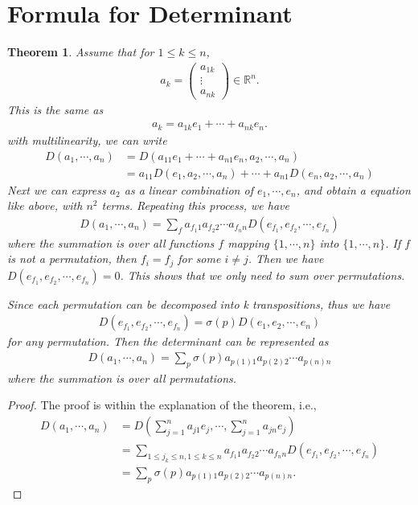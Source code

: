 \documentclass[11pt]{book}
\newtheorem{theorem}{Theorem}[section]
\theoremstyle{definition}
\numberwithin{equation}{chapter}
\begin{document}
\medskip

\section{Formula for Determinant}
\begin{theorem}
Assume that for $1\leq k \leq n$, 
\begin{align*}
    a_k = \left(
    \begin{matrix}
        a_{1k} \\
        \vdots \\
        a_{n k}
    \end{matrix}
    \right)\in\mathbb{R}^n.
\end{align*}
This is the same as 
\begin{align*}
    a_k = a_{1k}e_1 + \cdots + a_{nk}e_n.
\end{align*}
with multilinearity, we can write
\begin{align*}
    D(a_1,\cdots,a_n) & = D(a_{11}e_1 + \cdots + a_{n1}e_n, a_2,\cdots,a_n) \\
    & = a_{11}D(e_1,a_2,\cdots,a_n) + \cdots + a_{n1}D(e_n,a_2,\cdots,a_n)
\end{align*}
Next we can express $a_2$ as a linear combination of $e_1,\cdots,e_n$, and obtain a equation like above, with $n^2$ terms. Repeating this process, we have
\begin{align*}
    D(a_1,\cdots,a_n) = \sum_f a_{f_1 1}a_{f_2 2}\cdots a_{f_n n} D(e_{f_1}, e_{f_2},\cdots, e_{f_n})
\end{align*}
where the summation is over all functions $f$ mapping $\{1,\cdots,n\}$ into $\{1,\cdots,n\}$. If $f$ is not a permutation, then $f_i = f_j$ for some $i\neq j$. Then we have $D(e_{f_1}, e_{f_2},\cdots, e_{f_n}) = 0$. This shows that we only need to sum over permutations.

Since each permutation can be decomposed into k transpositions, thus we have 
\begin{align*}
    D(e_{f_1}, e_{f_2},\cdots, e_{f_n}) = \sigma(p) D(e_1, e_2,\cdots, e_n)
\end{align*}
for any permutation. Then the determinant can be represented as
\begin{align*}
    D(a_1,\cdots,a_n) = \sum_p \sigma(p) a_{p(1)1} a_{p(2)2} \cdots a_{p(n)n}
\end{align*}
where the summation is over all permutations.
\end{theorem}
\begin{proof}
The proof is within the explanation of the theorem, i.e., 
\begin{align*}
    D(a_1,\cdots,a_n) & = D\left(\sum^n_{j=1}a_{j1}e_j, \cdots, \sum^n_{j=1}a_{jn}e_j\right) \\
    & = \sum_{1\leq j_k \leq n, 1\leq k \leq n} a_{f_1 1}a_{f_2 2}\cdots a_{f_n n} D(e_{f_1}, e_{f_2},\cdots, e_{f_n}) \\
    & = \sum_p \sigma(p) a_{p(1)1} a_{p(2)2} \cdots a_{p(n)n}.
\end{align*}
\end{proof}
\end{document}
